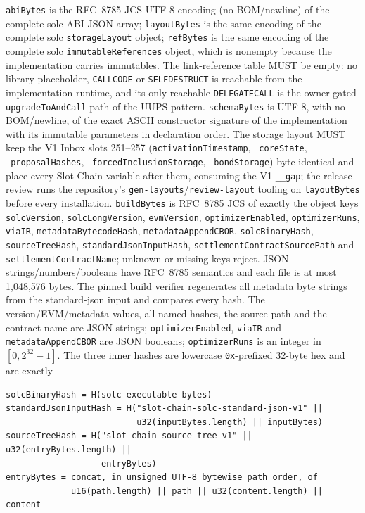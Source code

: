 \documentclass[a4paper,11pt]{article}
\newcommand{\code}[1]{\nolinkurl{#1}}
\begin{document}
\code{abiBytes} is the RFC~8785 JCS UTF-8 encoding (no BOM/newline) of the
complete solc ABI JSON array; \code{layoutBytes} is the same encoding of the
complete solc \code{storageLayout} object; \code{refBytes} is the same
encoding of the complete solc \code{immutableReferences} object, which is
nonempty because the implementation carries immutables.  The link-reference
table MUST be empty: no library placeholder, \code{CALLCODE} or
\code{SELFDESTRUCT} is reachable from the implementation runtime, and its only
reachable \code{DELEGATECALL} is the owner-gated \code{upgradeToAndCall} path
of the UUPS pattern.  \code{schemaBytes} is UTF-8, with no BOM/newline, of
the exact ASCII constructor signature of the implementation with its
immutable parameters in declaration order.  The storage layout MUST keep the
V1 Inbox slots 251--257 (\code{activationTimestamp}, \code{_coreState},
\code{_proposalHashes}, \code{_forcedInclusionStorage}, \code{_bondStorage})
byte-identical and place every Slot-Chain variable after them, consuming the
V1 \code{__gap}; the release review runs the repository's
\code{gen-layouts}/\code{review-layout} tooling on \code{layoutBytes} before
every installation.  \code{buildBytes} is RFC~8785 JCS of exactly the object
keys \code{solcVersion}, \code{solcLongVersion}, \code{evmVersion},
\code{optimizerEnabled}, \code{optimizerRuns}, \code{viaIR},
\code{metadataBytecodeHash}, \code{metadataAppendCBOR},
\code{solcBinaryHash}, \code{sourceTreeHash},
\code{standardJsonInputHash}, \code{settlementContractSourcePath} and
\code{settlementContractName}; unknown or missing keys reject.  JSON
strings/numbers/booleans have RFC~8785 semantics and each file is at most
1,048,576 bytes.  The pinned build verifier regenerates all metadata byte
strings from the standard-json input and compares every hash.  The
version/EVM/metadata values, all named hashes, the source path and the
contract name are JSON strings; \code{optimizerEnabled}, \code{viaIR} and
\code{metadataAppendCBOR} are JSON booleans; \code{optimizerRuns} is an
integer in \([0,2^{32}-1]\).  The three inner hashes are lowercase
\code{0x}-prefixed 32-byte hex and are exactly
\begin{verbatim}
solcBinaryHash = H(solc executable bytes)
standardJsonInputHash = H("slot-chain-solc-standard-json-v1" ||
                          u32(inputBytes.length) || inputBytes)
sourceTreeHash = H("slot-chain-source-tree-v1" || u32(entryBytes.length) ||
                   entryBytes)
entryBytes = concat, in unsigned UTF-8 bytewise path order, of
             u16(path.length) || path || u32(content.length) || content
\end{verbatim}
\end{document}

